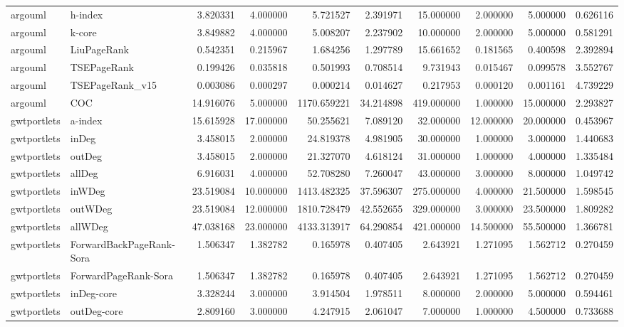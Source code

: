\begin{tabular}{llrrrrrrrr}
argouml & h-index & 3.820331 & 4.000000 & 5.721527 & 2.391971 & 15.000000 & 2.000000 & 5.000000 & 0.626116 \\
argouml & k-core & 3.849882 & 4.000000 & 5.008207 & 2.237902 & 10.000000 & 2.000000 & 5.000000 & 0.581291 \\
argouml & LiuPageRank & 0.542351 & 0.215967 & 1.684256 & 1.297789 & 15.661652 & 0.181565 & 0.400598 & 2.392894 \\
argouml & TSEPageRank & 0.199426 & 0.035818 & 0.501993 & 0.708514 & 9.731943 & 0.015467 & 0.099578 & 3.552767 \\
argouml & TSEPageRank_v15 & 0.003086 & 0.000297 & 0.000214 & 0.014627 & 0.217953 & 0.000120 & 0.001161 & 4.739229 \\
argouml & COC & 14.916076 & 5.000000 & 1170.659221 & 34.214898 & 419.000000 & 1.000000 & 15.000000 & 2.293827 \\
gwtportlets & a-index & 15.615928 & 17.000000 & 50.255621 & 7.089120 & 32.000000 & 12.000000 & 20.000000 & 0.453967 \\
gwtportlets & inDeg & 3.458015 & 2.000000 & 24.819378 & 4.981905 & 30.000000 & 1.000000 & 3.000000 & 1.440683 \\
gwtportlets & outDeg & 3.458015 & 2.000000 & 21.327070 & 4.618124 & 31.000000 & 1.000000 & 4.000000 & 1.335484 \\
gwtportlets & allDeg & 6.916031 & 4.000000 & 52.708280 & 7.260047 & 43.000000 & 3.000000 & 8.000000 & 1.049742 \\
gwtportlets & inWDeg & 23.519084 & 10.000000 & 1413.482325 & 37.596307 & 275.000000 & 4.000000 & 21.500000 & 1.598545 \\
gwtportlets & outWDeg & 23.519084 & 12.000000 & 1810.728479 & 42.552655 & 329.000000 & 3.000000 & 23.500000 & 1.809282 \\
gwtportlets & allWDeg & 47.038168 & 23.000000 & 4133.313917 & 64.290854 & 421.000000 & 14.500000 & 55.500000 & 1.366781 \\
gwtportlets & ForwardBackPageRank-Sora & 1.506347 & 1.382782 & 0.165978 & 0.407405 & 2.643921 & 1.271095 & 1.562712 & 0.270459 \\
gwtportlets & ForwardPageRank-Sora & 1.506347 & 1.382782 & 0.165978 & 0.407405 & 2.643921 & 1.271095 & 1.562712 & 0.270459 \\
gwtportlets & inDeg-core & 3.328244 & 3.000000 & 3.914504 & 1.978511 & 8.000000 & 2.000000 & 5.000000 & 0.594461 \\
gwtportlets & outDeg-core & 2.809160 & 3.000000 & 4.247915 & 2.061047 & 7.000000 & 1.000000 & 4.500000 & 0.733688 \\

\end{tabular}
